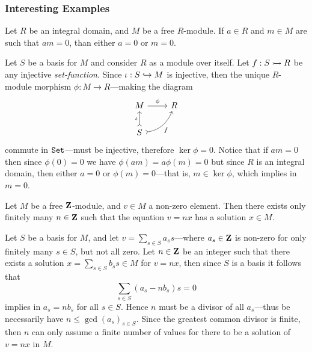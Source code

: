 \subsubsection{Interesting Examples}

\begin{example}
\label{exp:free-module-over-integral-domain}
Let \(R\) be an integral domain, and \(M\) be a free \(R\)-module. If
\(a \in R\) and \(m \in M\) are such that \(a m = 0\), than either \(a = 0\) or
\(m = 0\).

Let \(S\) be a basis for \(M\) and consider \(R\) as a module over itself. Let
\(f: S \rightarrowtail R\) be any injective \emph{set-function}. Since \(\iota: S \hookrightarrow M\)
is injective, then the unique \(R\)-module morphism \(\phi: M \to R\)---making
the diagram
\[
\begin{tikzcd}
M \ar[r, "\phi"] &R \\
S \ar[u, tail, "\iota"] \ar[ru, bend right, tail, "f"']
\end{tikzcd}
\]
commute in \({\texttt{Set}}\)---must be injective, therefore \(\ker \phi = 0\). Notice
that if \(a m = 0\) then since \(\phi(0) = 0\) we have
\(\phi(a m) = a \phi(m) = 0\) but since \(R\) is an integral domain, then either
\(a = 0\) or \(\phi(m) = 0\)---that is, \(m \in \ker \phi\), which implies in
\(m = 0\).
\end{example}

\begin{example}
\label{exp:finite-solution-v-equal-nx}
Let \(M\) be a free \(\mathbf{Z}\)-module, and \(v \in M\) a non-zero element. Then
there exists only finitely many \(n \in \mathbf{Z}\) such that the equation \(v = n x\)
has a solution \(x \in M\).

Let \(S\) be a basis for \(M\), and let \(v = \sum_{s \in S} a_s s\)---where
\(a_s \in \mathbf{Z}\) is non-zero for only finitely many \(s \in S\), but not all
zero. Let \(n \in \mathbf{Z}\) be an integer such that there exists a solution
\(x = \sum_{s \in S} b_s s \in M\) for \(v = n x\), then since \(S\) is a basis
it follows that
\[
\sum_{s \in S}(a_s - n b_s) s = 0
\]
implies in \(a_s = n b_s\) for all \(s \in S\). Hence \(n\) must be a divisor of
all \(a_s\)---thus be necessarily have \(n \leq \gcd(a_s)_{s \in S}\). Since the
greatest common divisor is finite, then \(n\) can only assume a finite number of
values for there to be a solution of \(v = n x\) in \(M\).
\end{example}

